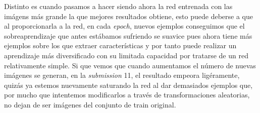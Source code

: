Distinto es cuando pasamos a hacer  siendo ahora la red entrenada con las imágens más grande la que mejores resultados obtiene, esto puede deberse a que al proporcionarla a la red, en cada \textit{epoch}, nuevos ejemplos conseguimos que el sobreaprendizaje que antes estábamos sufriendo se suavice pues ahora tiene más ejemplos sobre los que extraer características y por tanto puede realizar un aprendizaje más diversificado con su limitada capacidad por tratarse de un red relativamente simple. Si que vemos que cuando aumentamos el número de nuevas imágenes se generan, en la \textit{submission} 11, el resultado empeora ligéramente, quizás ya estemos nuevamente saturando la red al dar demasiados ejemplos que, por mucho que intentemos modificarlos a través de transformaciones aleatorias, no dejan de ser imágenes del conjunto de train original.



